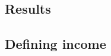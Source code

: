 \documentclass[twoside]{article}\usepackage[]{graphicx}\usepackage[]{color}
\begin{document}
\begin{multicols}{2}











\section{Results}



\subsection{Defining income}



\end{multicols}
\end{document}
